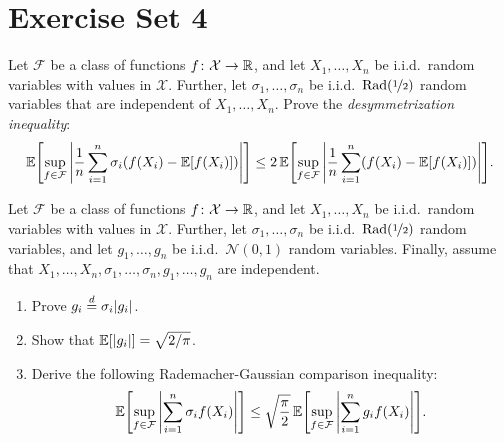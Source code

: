 \section{Exercise Set 4}

\begin{exercise}
Let $\mathcal{F}$ be a class of functions $f \colon \mathcal{X} \to \mathbb{R}$, and let $X_1, \dots, X_n$ be i.i.d.\ random variables with values in $\mathcal{X}$. Further, let $\sigma_1, \dots, \sigma_n$ be i.i.d.\ $\operatorname{Rad}(\nicefrac{1}{2})$ random variables that are independent of $X_1, \dots, X_n$. Prove the \emph{desymmetrization inequality}:
\[
    \Exp\left[\sup_{f \in \mathcal{F}} \abs{\frac{1}{n} \sum_{i=1}^n \sigma_i (f(X_i) - \Exp[f(X_i)])}\right] \leq 2 \Exp\left[\sup_{f \in \mathcal{F}} \abs{\frac{1}{n} \sum_{i=1}^n (f(X_i) - \Exp[f(X_i)])}\right].
\]
\end{exercise}


\begin{exercise}
Let $\mathcal{F}$ be a class of functions $f \colon \mathcal{X} \to \mathbb{R}$, and let $X_1, \dots, X_n$ be i.i.d.\ random variables with values in $\mathcal{X}$. Further, let $\sigma_1, \dots, \sigma_n$ be i.i.d.\ $\operatorname{Rad}(\nicefrac{1}{2})$ random variables, and let $g_1, \dots, g_n$ be i.i.d.\ $\mathcal{N}(0, 1)$ random variables. Finally, assume that $X_1, \dots, X_n, \sigma_1, \dots, \sigma_n, g_1, \dots, g_n$ are independent.
\begin{enumerate}
    \item Prove $g_i \stackrel{d}{=} \sigma_i \abs{g_i}$.

    \item Show that $\operatorname{\mathbb{E}}[\abs{g_i}] = \sqrt{2 / \pi}$.

    \item Derive the following Rademacher-Gaussian comparison inequality:
            \[
                \Exp\left[\sup_{f \in \mathcal{F}} \abs{\sum_{i=1}^n \sigma_i f(X_i)}\right] \leq \sqrt{\frac{\pi}{2}} \Exp\left[\sup_{f \in \mathcal{F}} \abs{\sum_{i=1}^n g_i f(X_i)}\right] .
            \]
\end{enumerate}
\end{exercise}


